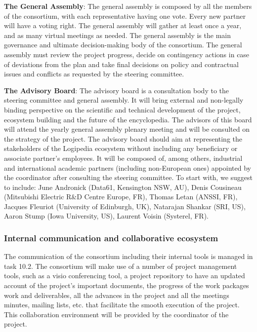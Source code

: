 \begin{compactitem}
\item{\bf The General Assembly}: The general assembly is composed by all
the members of the consortium, with each representative having one
vote. Every new partner will have a voting right. The general assembly
will gather at least once a year, and as many virtual meetings as
needed. The general assembly is the main governance and ultimate
decision-making body of the consortium. The general assembly must
review the project progress, decide on contingency actions in case of
deviations from the plan and take final decisions on policy and
contractual issues and conflicts as requested by the steering
committee.

\item{\bf The Advisory Board}: The advisory board is a consultation body to
the steering committee and general assembly. It will bring external
and non-legally binding perspective on the scientific and technical
development of the project, ecosystem building and the future of the
encyclopedia. The advisors of this board will attend the yearly
general assembly plenary meeting and will be consulted on the strategy
of the project. The advisory board should aim at representing the
stakeholders of the Logipedia ecosystem without including any
beneficiary or associate partner’s employees. It will be composed of,
among others, industrial and international academic partners
(including non-European ones) appointed by the coordinator after
consulting the steering committee. To start with, we suggest to
include: June Andronick (Data61, Kensington NSW, AU), Denis Cousineau
(Mitsubishi Electric R\&D Centre Europe, FR), Thomas Letan (ANSSI, FR),
Jacques Fleuriot (University of Edinburgh, UK), Natarajan Shankar
(SRI, US), Aaron Stump (Iowa University, US), Laurent Voisin
(Systerel, FR).
\end{compactitem}

\subsubsection*{Internal communication and collaborative ecosystem}

The communication of the consortium including their internal tools is
managed in task 10.2.  The consortium will make use of a number of
project management tools, such as a visio conferencing tool, a project
repository to have an updated account of the project’s important
documents, the progress of the work packages work and deliverables,
all the advances in the project and all the meetings minutes, mailing
lists, etc. that facilitate the smooth execution of the project. This
collaboration environment will be provided by the coordinator of the
project.

